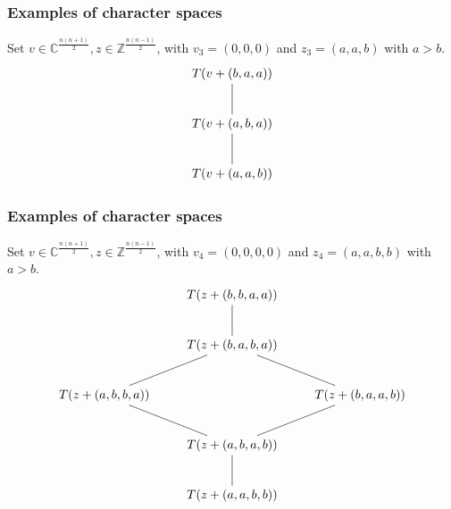 \documentclass[smaller,usepdftitle=false]{beamer}
\newcommand\CC{\mathbb C}
\newcommand\ZZ{\mathbb Z}
\begin{document}
\begin{frame}
\frametitle{Examples of character spaces}
Set $v \in \CC^{\frac{n(n+1)}{2}}, z \in \ZZ^{\frac{n(n-1)}{2}}$, with $v_3 = 
(0,0,0)$ and $z_3 = (a,a,b)$ with $a > b$.
\begin{align*}
\xymatrix{
	T(v+(b,a,a)) \\
	T(v+(a,b,a)) \ar@{-}[u] \\
	T(v+(a,a,b)) \ar@{-}[u]
}
\end{align*}
\end{frame}

\begin{frame}
\frametitle{Examples of character spaces}
Set $v \in \CC^{\frac{n(n+1)}{2}}, z \in \ZZ^{\frac{n(n-1)}{2}}$, with $v_4 = 
(0,0,0,0)$ and $z_4 = (a,a,b,b)$ with $a > b$.
\begin{align*}
\xymatrix{
& T(z+(b,b,a,a)) & \\
& T(z+(b,a,b,a)) \ar@{-}[u]& \\
T(z+(a,b,b,a)) \ar@{-}[ur] & & T(z+(b,a,a,b)) \ar@{-}[ul] \\
& T(z+(a,b,a,b)) \ar@{-}[ul] \ar@{-}[ur]& \\
& T(z+(a,a,b,b)) \ar@{-}[u]& 
}
\end{align*}
\end{frame}
\end{document}
